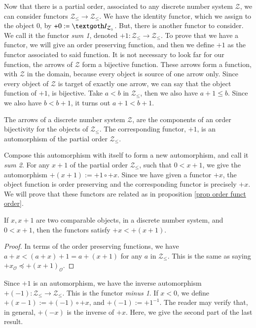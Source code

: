 \documentclass [12pt]{book}
\begin{document}
Now that there is a partial order, associated to any discrete number system $\mathcal Z$, we can consider functors $\mathcal Z_\leq\rightarrow\mathcal Z_\leq$. We have the identity functor, which we assign to the object $0$, by $+0:=\textgoth I_{\mathcal Z_\leq}$. But, there is another functor to consider. We call it the functor \textit{sum 1}, denoted $+1:\mathcal Z_\leq\rightarrow\mathcal Z_\leq$. To prove that we have a functor, we will give an order preserving function, and then we define $+1$ as the functor associated to said function. It is not necessary to look far for our function, the arrows of $\mathcal Z$ form a bijective function. These arrows form a function, with $\mathcal Z$ in the domain, because every object is source of one arrow only. Since every object of $\mathcal Z$ is target of exactly one arrow, we can say that the object function of $+1$, is bijective. Take $a<b$ in $\mathcal Z_\leq$, then we also have $a+1\leq b$. Since we also have $b<b+1$, it turns out $a+1<b+1$. 

\begin{proposition}The arrows of a discrete number system $\mathcal Z$, are the components of an order bijectivity for the objects of $\mathcal Z_\leq$. The corresponding functor, $+1$, is an automorphism of the partial order $\mathcal Z_\leq$.\end{proposition}

Compose this automorphism with itself to form a new automorphism, and call it \textit{sum 2}. For any $x+1$ of the partial order $\mathcal Z_\leq$, such that $0<x+1$, we give the automorphism $+(x+1):=+1\circ+x$. Since we have given a functor $+x$, the object function is order preserving and the corresponding functor is precisely $+x$. We will prove that these functors are related as in proposition \ref{prop order funct order}.

\begin{lemma order funct1}If $x,x+1$ are two comparable objects, in a discrete number system, and $0<x+1$, then the functors satisfy $+x<+(x+1)$.\end{lemma order funct1}

\begin{proof}In terms of the order preserving functions, we have $a+x<(a+x)+1=a+(x+1)$ for any $a$ in $\mathcal Z_\leq$. This is the same as saying $+x_\mathcal O\preceq+(x+1)_\mathcal O$.\end{proof}

Since $+1$ is an automorphism, we have the inverse automorphism $+(-1):\mathcal Z_\leq\rightarrow\mathcal Z_\leq$. This is the functor \textit{minus 1}. If $x<0$, we define $+(x-1):=+(-1)\circ+x$, and $+(-1):=+1^{-1}$. The reader may verify that, in general, $+(-x)$ is the inverse of $+x$. Here, we give the second part of the last result.
\end{document}
